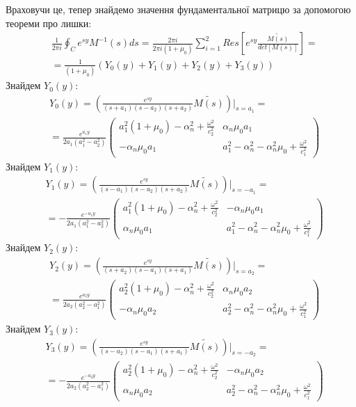 Враховучи це, тепер знайдемо значення фундаментальної матрицю за допомогою теореми про лишки:
\begin{align*}
    &\frac{1}{2\pi i} \oint_C e^{sy} M^{-1}(s)ds = \frac{2 \pi i}{2 \pi i (1 + \mu_0)} \sum_{i=1}^{2} Res\left[ e^{sy} \frac{\widetilde{M(s)}}{det[M(s)]} \right] = \\
    & = \frac{1}{(1 + \mu_0)} \left(Y_0(y) + Y_1(y) + Y_2(y) + Y_3(y) \right)
\end{align*}
Знайдем $Y_0(y)$:
\begin{align}
    &Y_0(y) =  \left( \frac{e^{sy}}{(s+a_1)(s - a_2)(s + a_2)} \widetilde{M(s)} \right) \Big|_{s=a_1} = \nonumber \\
    &=\frac{e^{a_1 y}}{2a_1 (a_1^2 - a_2^2)} \begin{pmatrix}
        a_1^2 (1 + \mu_0) -\alpha_n^2 + \frac{\omega^2}{c_2^2} & \alpha_n \mu_0 a_1 \\
        -\alpha_n \mu_0 a_1 & a_1^2 - \alpha_n^2 - \alpha_n^2\mu_0 + \frac{\omega^2}{c_1^2}
    \end{pmatrix}
\end{align}
Знайдем $Y_1(y)$:
\begin{align}
    &Y_1(y) =  \left( \frac{e^{sy}}{(s-a_1)(s - a_2)(s + a_2)} \widetilde{M(s)} \right) \Big|_{s=-a_1} = \nonumber \\
    &=-\frac{e^{-a_1 y}}{2a_1 (a_1^2 - a_2^2)} \begin{pmatrix}
        a_1^2 (1 + \mu_0) -\alpha_n^2 + \frac{\omega^2}{c_2^2} & -\alpha_n \mu_0 a_1 \\
        \alpha_n \mu_0 a_1 & a_1^2 - \alpha_n^2 - \alpha_n^2\mu_0 + \frac{\omega^2}{c_1^2}
    \end{pmatrix}
\end{align}
Знайдем $Y_2(y)$:
\begin{align}
    &Y_2(y) =  \left( \frac{e^{sy}}{(s+a_2)(s - a_1)(s + a_1)} \widetilde{M(s)} \right) \Big|_{s=a_2} = \nonumber \\
    &=\frac{e^{a_2 y}}{2a_2 (a_2^2 - a_1^2)} \begin{pmatrix}
        a_2^2 (1 + \mu_0) -\alpha_n^2 + \frac{\omega^2}{c_2^2} & \alpha_n \mu_0 a_2 \\
        -\alpha_n \mu_0 a_2 & a_2^2 - \alpha_n^2 - \alpha_n^2\mu_0 + \frac{\omega^2}{c_1^2}
    \end{pmatrix}
\end{align}
Знайдем $Y_3(y)$:
\begin{align}
    &Y_3(y) =  \left( \frac{e^{sy}}{(s-a_2)(s - a_1)(s + a_1)} \widetilde{M(s)} \right) \Big|_{s=-a_2} = \nonumber \\
    &=-\frac{e^{-a_2 y}}{2a_2 (a_2^2 - a_1^2)} \begin{pmatrix}
        a_2^2 (1 + \mu_0) -\alpha_n^2 + \frac{\omega^2}{c_2^2} & -\alpha_n \mu_0 a_2 \\
        \alpha_n \mu_0 a_2 & a_2^2 - \alpha_n^2 - \alpha_n^2\mu_0 + \frac{\omega^2}{c_1^2}
    \end{pmatrix}
\end{align}

